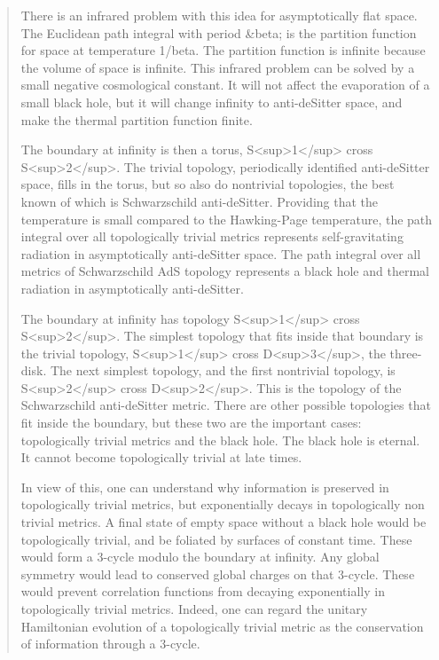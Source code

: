 \begin{quote}
     There is an infrared problem with this idea for asymptotically flat
     space.  The Euclidean path integral with period &beta; is the partition
     function for space at temperature 1/beta. The partition function 
     is infinite because the volume of space is infinite.  This infrared 
     problem can be solved by a small negative cosmological constant.  
     It will not affect the evaporation of a small black hole, but it will 
     change infinity to anti-deSitter space, and make the thermal partition 
     function finite.

     The boundary at infinity is then a torus, S<sup>1</sup> cross S<sup>2</sup>.  The trivial
     topology, periodically identified anti-deSitter space, fills in the 
     torus, but so also do nontrivial topologies, the best known of which 
     is Schwarzschild anti-deSitter.  Providing that the temperature is 
     small compared to the Hawking-Page temperature, the path integral 
     over all topologically trivial metrics represents self-gravitating 
     radiation in asymptotically anti-deSitter space.   The path integral 
     over all metrics of Schwarzschild AdS topology represents a black 
     hole and thermal radiation in asymptotically anti-deSitter.

     The boundary at infinity has topology S<sup>1</sup> cross S<sup>2</sup>.  The simplest
     topology that fits inside that boundary is the trivial topology, 
     S<sup>1</sup> cross D<sup>3</sup>, the three-disk. The next simplest topology, and 
     the first nontrivial topology, is S<sup>2</sup> cross D<sup>2</sup>.  
This is the 
     topology of the Schwarzschild anti-deSitter metric.  There are 
     other possible topologies that fit inside the boundary, but these 
     two are the important cases: topologically trivial metrics and 
     the black hole.  The black hole is eternal.  It cannot become 
     topologically trivial at late times.

     In view of this, one can understand why information is preserved in
     topologically trivial metrics, but exponentially decays in 
     topologically non trivial metrics.  A final state of empty space
     without a black hole would be topologically trivial, and be foliated
     by surfaces of constant time.  These would form a 3-cycle modulo
     the boundary at infinity.  Any global symmetry would lead to
     conserved global charges on that 3-cycle.  These would prevent
     correlation functions from decaying exponentially in topologically
     trivial metrics.  Indeed, one can regard the unitary Hamiltonian
     evolution of a topologically trivial metric as the conservation of
     information through a 3-cycle.


\end{quote}
